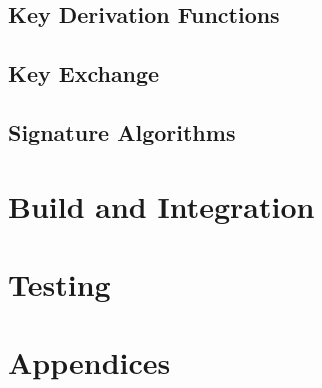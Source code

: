 \documentclass[11pt,a4paper]{report}
\theoremstyle{definitionstyle}
\begin{document}
\section{Key Derivation Functions}

\section{Key Exchange}

\section{Signature Algorithms}

\chapter{Build and Integration}

\chapter{Testing}


\newpage
\appendix
\chapter*{Appendices}
\end{document}
